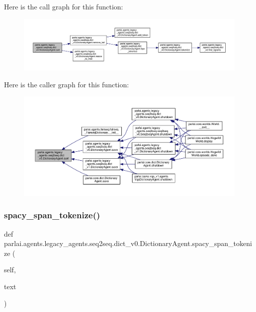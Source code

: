 Here is the call graph for this function\+:
\nopagebreak
\begin{figure}[H]
\begin{center}
\leavevmode
\includegraphics[width=350pt]{classparlai_1_1agents_1_1legacy__agents_1_1seq2seq_1_1dict__v0_1_1DictionaryAgent_a346cc45c8e6eba82cb76878445e843cf_cgraph}
\end{center}
\end{figure}
Here is the caller graph for this function\+:
\nopagebreak
\begin{figure}[H]
\begin{center}
\leavevmode
\includegraphics[width=350pt]{classparlai_1_1agents_1_1legacy__agents_1_1seq2seq_1_1dict__v0_1_1DictionaryAgent_a346cc45c8e6eba82cb76878445e843cf_icgraph}
\end{center}
\end{figure}
\mbox{\label{classparlai_1_1agents_1_1legacy__agents_1_1seq2seq_1_1dict__v0_1_1DictionaryAgent_a9e091c9b3daf9f5e7496f7aac6f473eb}} 
\subsubsection{\texorpdfstring{spacy\+\_\+span\+\_\+tokenize()}{spacy\_span\_tokenize()}}
{\footnotesize\ttfamily def parlai.\+agents.\+legacy\+\_\+agents.\+seq2seq.\+dict\+\_\+v0.\+Dictionary\+Agent.\+spacy\+\_\+span\+\_\+tokenize (\begin{DoxyParamCaption}\item[{}]{self,  }\item[{}]{text }\end{DoxyParamCaption})}

